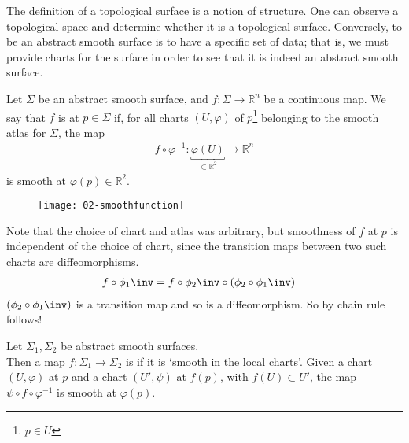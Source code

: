 \begin{remark}
	The definition of a topological surface is a notion of structure.
	One can observe a topological space and determine whether it is a topological surface.
	Conversely, to be an abstract smooth surface is to have a specific set of data; that is, we must provide charts for the surface in order to see that it is indeed an abstract smooth surface.
\end{remark}

\begin{definition}
	Let $\Sigma$ be an abstract smooth surface, and $f \colon \Sigma \to \mathbb R^n$ be a continuous map.
	We say that $f$ is  at $p \in \Sigma$ if, for all charts $(U, \varphi)$ of $p$\footnote{$p \in U$} belonging to the smooth atlas for $\Sigma$, the map
	\begin{align*}
		f \circ \varphi^{-1} \colon \underbracket{\varphi(U)}_{\subset \mathbb{R}^2} \to \mathbb R^n
	\end{align*}
	is smooth at $\varphi(p) \in \mathbb R^2$.
\end{definition}

\begin{figure}[h] 
    \centering 
    \texttt{[image: 02-smoothfunction]} 
\end{figure}

\begin{remark}
	Note that the choice of chart and atlas was arbitrary, but smoothness of $f$ at $p$ is independent of the choice of chart, since the transition maps between two such charts are diffeomorphisms.
	\begin{align*}
		f \circ \phi_1\inv &= f \circ \phi_2\inv \circ (\phi_2 \circ \phi_1\inv)
	\end{align*} 
	$(\phi_2 \circ \phi_1\inv)$ is a transition map and so is a diffeomorphism. So by chain rule follows!
\end{remark}

\begin{definition}
	Let $\Sigma_1, \Sigma_2$ be abstract smooth surfaces. \\
	Then a map $f \colon \Sigma_1 \to \Sigma_2$ is  if it is `smooth in the local charts'.
	Given a chart $(U, \varphi)$ at $p$ and a chart $(U', \psi)$ at $f(p)$, with $f(U) \subset U'$, the map $\psi \circ f \circ \varphi^{-1}$ is smooth at $\varphi(p)$.
\end{definition}

